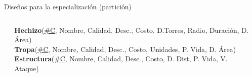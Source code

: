\begin{frame}{Dise\~nos para la especializaci\'on (partici\'on)}
\begin{columns}[T]
\begin{column}{0.48\linewidth}
        \end{column}

        \begin{column}{0.48\linewidth}
            \vspace{12mm}
            \begin{scriptsize}
                \textbf{Hechizo}(\underline{\#C}, Nombre, Calidad, Desc., Costo, D.Torres, Radio, Duraci\'on, D. \'Area)\\[1mm]
               
                \textbf{Tropa}(\underline{\#C}, Nombre, Calidad, Desc., Costo, Unidades, P. Vida, D. \'Area)\\[1mm]
                \textbf{Estructura}(\underline{\#C}, Nombre, Calidad, Desc., Costo, D. Dist, P. Vida, V. Ataque)\\[1mm]
            \end{scriptsize}
        \end{column}
        
    \end{columns}


\end{frame}


